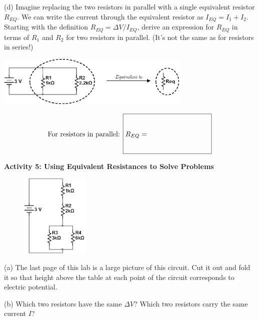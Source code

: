 (d) Imagine replacing the two resistors in parallel with a single equivalent resistor $R_{EQ}$.   We can write the current through the equivalent resistor as $I_{EQ}=I_1+I_2$.  Starting with the definition $R_{EQ}=  \Delta V \slash I_{EQ}$, derive an expression for $R_{EQ}$ in terms of $R_1$ and $R_2$ for two resistors in parallel.  (It's not the same as for resistors in series!)

\begin{center}
\includegraphics[width=0.7\textwidth]{electric_circuits2/parallel_equiv_bw.eps}
\answerspace{1 in}
\end{center}

\begin{displaymath}
\textrm{For resistors in parallel: } \boxed{R_{EQ} = \phantom{\rule[-0.3in]{1.2in}{.7in}}} 
\end{displaymath}

\textbf{Activity 5: Using Equivalent Resistances to Solve Problems}

\begin{figure}
    \vspace{-0.3 in}
    \includegraphics[width=0.29\textwidth]{electric_circuits2/circ_diag6_bw.eps}
\end{figure}

(a) The last page of this lab is a large picture of this circuit.  Cut it out and fold it so that height above the table at each point of the circuit corresponds to electric potential.  

(b) Which two resistors have the same $\Delta V$?  Which two resistors carry the same current $I$?
\answerspace{0.6 in}

